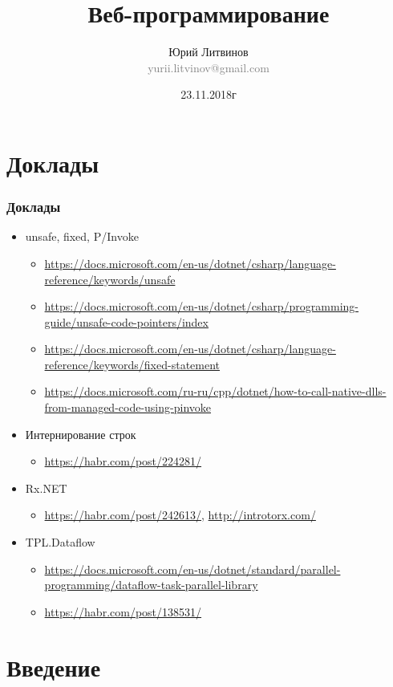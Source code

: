 \documentclass[xetex,mathserif,serif]{beamer}
\title{Веб-программирование}
\author[Юрий Литвинов]{Юрий Литвинов\\\small{\textcolor{gray}{yurii.litvinov@gmail.com}}}
\date{23.11.2018г}
\begin{document}
	\frame{\titlepage}

	\section{Доклады}

	\begin{frame}
		\frametitle{Доклады}
		\begin{itemize}
			\item unsafe, fixed, P/Invoke
			\begin{itemize}
				\item \url{https://docs.microsoft.com/en-us/dotnet/csharp/language-reference/keywords/unsafe}
				\item \url{https://docs.microsoft.com/en-us/dotnet/csharp/programming-guide/unsafe-code-pointers/index}
				\item \url{https://docs.microsoft.com/en-us/dotnet/csharp/language-reference/keywords/fixed-statement}
				\item \url{https://docs.microsoft.com/ru-ru/cpp/dotnet/how-to-call-native-dlls-from-managed-code-using-pinvoke}
			\end{itemize}
			\item Интернирование строк
			\begin{itemize}
				\item \url{https://habr.com/post/224281/}
			\end{itemize}
			\item Rx.NET
			\begin{itemize}
				\item \url{https://habr.com/post/242613/}, \url{http://introtorx.com/}
			\end{itemize}
			\item TPL.Dataflow
			\begin{itemize}
				\item \url{https://docs.microsoft.com/en-us/dotnet/standard/parallel-programming/dataflow-task-parallel-library}
				\item \url{https://habr.com/post/138531/}
			\end{itemize}
		\end{itemize}
	\end{frame}

	\section{Введение}
\end{document}
